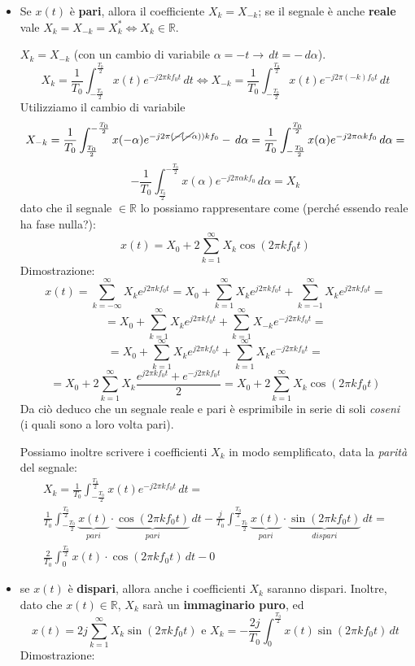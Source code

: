 \documentclass[
  paper=a4,
  ,captions=tableheading
]{scrartcl}
\begin{document}
\begin{enumerate}
  \begin{itemize}
  \item
    Se \(x(t)\) è \textbf{pari}, allora il coefficiente
    \(X_{k} = X_{-k}\); se il segnale è anche \textbf{reale} vale
    \(X_{k}=X_{-k}=X^{*}_{k} \Longleftrightarrow X_k \in \mathbb{R}\).

    \(X_k = X_{-k}\) (con un cambio di variabile
    \(\alpha=-t \to \,dt=-\,d\alpha\)). \[
      X_{k} = \frac{1}{T_0} \int_{-\frac{T_0}{2}}^{\frac{T_0}{2}} x(t) e^{-j2\pi kf_{0}t} \,dt \Longleftrightarrow X_{-k} = \frac{1}{T_0} \int_{-\frac{T_0}{2}}^{\frac{T_0}{2}} x(t) e^{-j2\pi (-k)f_{0}t} \,dt 
      \] Utilizziamo il cambio di variabile \[
      X_{-k} = \frac{1}{T_0} \int_{\frac{T_0}{2}}^{-\frac{T_0}{2}} x(-\alpha) e^{-j2\pi (\cancel{-}(\cancel{-}\alpha)) kf_{0}} -\,d\alpha = \frac{1}{T_0} \int_{-\frac{T_0}{2}}^{\frac{T_0}{2}} x(\alpha) e^{-j2\pi\alpha kf_{0}} \,d\alpha =
      \] \[
      -\frac{1}{T_0} \int_{\frac{T_0}{2}}^{-\frac{T_0}{2}} x(\alpha) e^{-j2\pi\alpha kf_{0}} \,d\alpha = X_k
      \] dato che il segnale \(\in \mathbb{R}\) lo possiamo
    rappresentare come (perché essendo reale ha fase nulla?): \[
      x(t) = X_{0} + 2\sum_{k=1}^{\infty}X_{k}\cos(2\pi kf_{0}t)
      \] Dimostrazione: \[
      x(t) = \sum_{k=-\infty}^{\infty} X_{k} e^{j2\pi kf_{0}t} = X_{0} + \sum_{k=1}^{\infty} X_{k} e^{j2\pi kf_{0}t} + \sum_{k=-1}^{\infty} X_{k} e^{j2\pi kf_{0}t} =
      \] \[
      = X_{0} + \sum_{k=1}^{\infty} X_{k} e^{j2\pi kf_{0}t} + \sum_{k=1}^{\infty} X_{-k} e^{-j2\pi kf_{0}t} =
      \] \[
      = X_{0} + \sum_{k=1}^{\infty} X_{k} e^{j2\pi kf_{0}t} + \sum_{k=1}^{\infty} X_{k} e^{-j2\pi kf_{0}t} =
      \] \[
      = X_{0} + 2 \sum_{k=1}^{\infty} X_{k} \frac{e^{j2\pi kf_{0}t}+ e^{-j2\pi kf_{0}t}}{2} = X_{0} + 2 \sum_{k=1}^{\infty} X_{k} \cos{(2\pi k f_{0}t)}
      \] Da ciò deduco che un segnale reale e pari è esprimibile in
    serie di soli \emph{coseni} (i quali sono a loro volta pari).

    Possiamo inoltre scrivere i coefficienti \(X_k\) in modo
    semplificato, data la \emph{parità} del segnale: \begin{gather*}
      X_k = \frac{1}{T_0}\int_{-\frac{T_0}{2}}^{\frac{T_0}{2}} x(t) e^{-j2\pi kf_{0}t} \,dt = \\
      \frac{1}{T_0}\int_{-\frac{T_0}{2}}^{\frac{T_0}{2}} \underbrace{x(t)}_{pari}\cdot\underbrace{\cos{(2\pi kf_{0}t)}}_{pari} \,dt - \frac{j}{T_0}\int_{-\frac{T_0}{2}}^{\frac{T_0}{2}} \underbrace{x(t)}_{pari}\cdot\underbrace{\sin{(2\pi kf_{0}t)}}_{dispari}\,dt=
      \\
      \frac{2}{T_0} \int_{0}^{\frac{T_0}{2}} x(t)\cdot\cos{(2\pi kf_{0}t)} \,dt - 0
      \end{gather*}
  \item
    se \(x(t)\) è \textbf{dispari}, allora anche i coefficienti \(X_k\)
    saranno dispari. Inoltre, dato che \(x(t)\in\mathbb{R}\), \(X_k\)
    sarà un \textbf{immaginario puro}, ed \[
      x(t)=2j \sum_{k=1}^{\infty} X_{k} \sin{(2\pi k f_{0}t)} \text{ e } X_k=-\frac{2j}{T_0}\int_{0}^{\frac{T_0}{2}}x(t)\sin(2\pi kf_0 t) \,dt
      \] Dimostrazione:


\end{itemize}
\end{enumerate}
\end{document}
